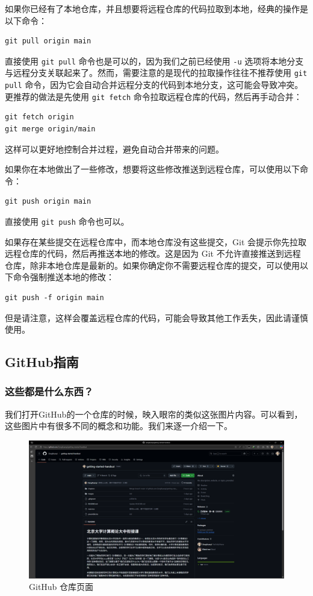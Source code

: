\documentclass[../main.tex]{subfiles}
\begin{document}
如果你已经有了本地仓库，并且想要将远程仓库的代码拉取到本地，经典的操作是以下命令：
\begin{verbatim}
git pull origin main
\end{verbatim}
直接使用 \texttt{git pull} 命令也是可以的，因为我们之前已经使用 \texttt{-u} 选项将本地分支与远程分支关联起来了。然而，需要注意的是现代的拉取操作往往不推荐使用 \texttt{git pull} 命令，因为它会自动合并远程分支的代码到本地分支，这可能会导致冲突。更推荐的做法是先使用 \texttt{git fetch} 命令拉取远程仓库的代码，然后再手动合并：
\begin{verbatim}
git fetch origin
git merge origin/main
\end{verbatim}
这样可以更好地控制合并过程，避免自动合并带来的问题。

如果你在本地做出了一些修改，想要将这些修改推送到远程仓库，可以使用以下命令：
\begin{verbatim}
git push origin main
\end{verbatim}
直接使用 \texttt{git push} 命令也可以。

如果存在某些提交在远程仓库中，而本地仓库没有这些提交，Git 会提示你先拉取远程仓库的代码，然后再推送本地的修改。这是因为 Git 不允许直接推送到远程仓库，除非本地仓库是最新的。如果你确定你不需要远程仓库的提交，可以使用以下命令强制推送本地的修改：
\begin{verbatim}
git push -f origin main
\end{verbatim}
但是请注意，这样会覆盖远程仓库的代码，可能会导致其他工作丢失，因此请谨慎使用。

\subsection{GitHub指南}

\subsubsection{这些都是什么东西？}

我们打开GitHub的一个仓库的时候，映入眼帘的类似这张图片内容。可以看到，这些图片中有很多不同的概念和功能。我们来逐一介绍一下。

\begin{figure}[!ht]
  \centering
  \includegraphics[width=\textwidth]{images/github.png}
  \caption{GitHub 仓库页面}
  \label{fig:github}
\end{figure}
\end{document}

